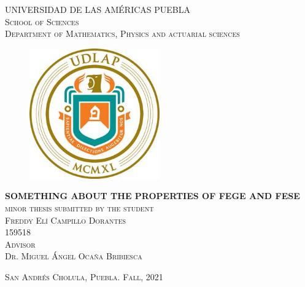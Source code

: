 \documentclass[12pt]{report}
\renewcommand{\title}{Something about the properties of FeGe and FeSe}
\newcommand{\UDLAP}{Universidad de las Américas Puebla}
\newcommand{\yo}{Freddy Elí Campillo Dorantes}
\newcommand{\ID}{159518}
\newcommand{\coco}{Dr. Miguel Ángel Ocaña Bribiesca}
\newcommand{\UC}{\expandafter\MakeUppercase\expandafter}
\begin{document}
\begin{titlepage}
\begin{center}
{\large \expandafter\MakeUppercase\expandafter{\UDLAP}}\\[4em]

\textsc{\large School of Sciences}\\[1em]

\textsc{\large Department of Mathematics, Physics and actuarial sciences}\\[1em]

\begin{figure}[h]
\begin{center}
\includegraphics[width=0.5\textwidth]{./figures/EscudoUDLAP.jpg}
\end{center}
\end{figure}

\vspace{2em}

{\Large \textbf{\UC{\title}}}\\[3em]

\textsc{\large 
minor thesis submitted  by the student}\\[1em]

\textsc{\large \yo}\\[1em]

\textsc{\large \ID}\\[1em]

\textsc{\large Advisor}\\[1em]

\textsc{\large \coco }

\end{center}

\vspace*{\fill}
\textsc{San Andrés Cholula, Puebla. \hspace*{\fill} Fall, 2021}

\end{titlepage}
\end{document}
